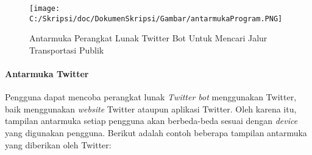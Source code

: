\begin{figure}
	\centering
		\texttt{[image: C:/Skripsi/doc/DokumenSkripsi/Gambar/antarmukaProgram.PNG]}
	\caption{Antarmuka Perangkat Lunak Twitter Bot Untuk Mencari Jalur Transportasi Publik}
	\label{fig:antarmukaProgram}
\end{figure}

\paragraph{Antarmuka Twitter}
Pengguna dapat mencoba perangkat lunak \textit{Twitter bot} menggunakan Twitter, baik menggunakan \textit{website} Twitter ataupun aplikasi Twitter. Oleh karena itu, tampilan antarmuka setiap pengguna akan berbeda-beda sesuai dengan \textit{device} yang digunakan pengguna. Berikut adalah contoh beberapa tampilan antarmuka yang diberikan oleh Twitter:

